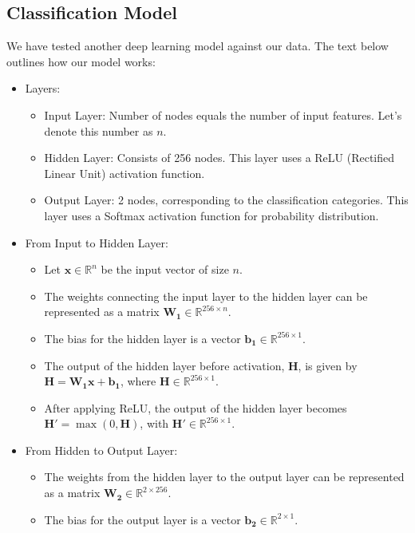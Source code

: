 \documentclass[UTF8]{mcmthesis}
\begin{document}
	
	
	\subsection{Classification Model}
	We have tested another deep learning model against our data. The text below outlines how our model works:
	
	\begin{itemize}
		\item Layers:
		\begin{itemize}
			\item Input Layer: Number of nodes equals the number of input features. Let's denote this number as \( n \).
			\item Hidden Layer: Consists of 256 nodes. This layer uses a ReLU (Rectified Linear Unit) activation function.
			\item Output Layer: 2 nodes, corresponding to the classification categories. This layer uses a Softmax activation function for probability distribution.
		\end{itemize}
		\item From Input to Hidden Layer:
		\begin{itemize}
			\item Let \( \mathbf{x} \in \mathbb{R}^{n} \) be the input vector of size \( n \).
			\item The weights connecting the input layer to the hidden layer can be represented as a matrix \( \mathbf{W_1} \in \mathbb{R}^{256 \times n} \).
			\item The bias for the hidden layer is a vector \( \mathbf{b_1} \in \mathbb{R}^{256 \times 1} \).
			\item The output of the hidden layer before activation, \( \mathbf{H} \), is given by  \( \mathbf{H} = \mathbf{W_1} \mathbf{x} + \mathbf{b_1} \), where \( \mathbf{H} \in \mathbb{R}^{256 \times 1} \).
			\item After applying ReLU, the output of the hidden layer becomes \( \mathbf{H'} = \max(0, \mathbf{H}) \), with \( \mathbf{H'} \in \mathbb{R}^{256 \times 1} \).
		\end{itemize}
		\item From Hidden to Output Layer:
		\begin{itemize}
			\item The weights from the hidden layer to the output layer can be represented as a matrix \( \mathbf{W_2} \in \mathbb{R}^{2 \times 256} \).
			\item The bias for the output layer is a vector \( \mathbf{b_2} \in \mathbb{R}^{2 \times 1} \).

\end{itemize}
\end{itemize}
\end{document}

